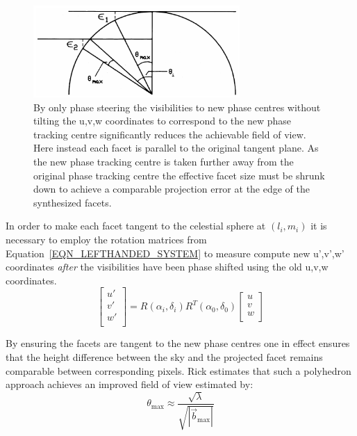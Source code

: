 \begin{figure}[h]
  \begin{mdframed}
    \centering
    \includegraphics[width=0.7\textwidth]{images/non_rotated_faceting.png}
    \caption[Faceting without regard of tangency]{By only phase steering the visibilities to new phase centres without tilting the u,v,w coordinates
    to correspond to the new phase tracking centre significantly reduces the achievable field of view. Here instead each facet is parallel to the 
    original tangent plane. As the new phase tracking centre is taken further away from the original phase tracking centre the effective facet size must be
    shrunk down to achieve a comparable projection error at the edge of the synthesized facets.}
    \label{fig_non_rotated_facets}
  \end{mdframed}
\end{figure}

In order to make each facet tangent to the celestial sphere at $(l_i,m_i)$ it is necessary to employ the rotation matrices from Equation~\ref{EQN_LEFTHANDED_SYSTEM}
to measure compute new u',v',w' coordinates \emph{after} the visibilities have been phase shifted using the old u,v,w coordinates.
\begin{equation}
 \left[\begin{array}{c}
	u'\\
	v'\\
	w'\\
       \end{array} \right] = R(\alpha_i,\delta_i)R^{T}(\alpha_0,\delta_0)\left[\begin{array}{c}
										u\\
										v \\
										w \\
									      \end{array}
									\right]
\end{equation}

By ensuring the facets are tangent to the new phase centres one in effect ensures that the height difference between the sky and the projected facet remains
comparable between corresponding pixels. Rick estimates that such a polyhedron approach achieves an improved field of view estimated by:
\begin{equation}
 \theta_{\text{max}} \approx \frac{\sqrt{\lambda}}{\sqrt{|\vec{b}_{\text{max}}|}}
\end{equation}

